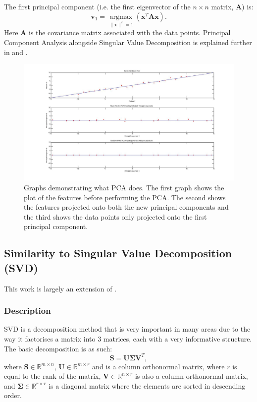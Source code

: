 \documentclass[11pt,a4paper]{article}
\newcommand{\covmat}{\mathbf{A}}
\begin{document}
The first principal component (i.e. the first eigenvector of the $n\times n$ matrix, $\mathbf{A}$) is:
\begin{equation}
\mathbf{v}_1 = \underset{\|\mathbf{x}\|^2 = 1}{\operatorname{argmax}}\left( \mathbf{x}^T\mathbf{A}\mathbf{x}\right).
\end{equation}
Here $\covmat$ is the covariance matrix associated with the data points. Principal Component Analysis alongside Singular Value Decomposition is explained further in \cite{datascience} and \cite{bishop}. 

\begin{figure}[H]
\centering
\includegraphics[scale=0.35]{PCA_EXPLAINED.jpg}
\caption{Graphs demonstrating what PCA does. The first graph shows the plot of the features before performing the PCA. The second shows the features projected onto both the new principal components and the third shows the data points only projected onto the first principal component.}
\label{pca}
\end{figure}

\subsection{Similarity to Singular Value Decomposition (SVD)}
This work is largely an extension of \cite{lecture_svd}.

\subsubsection{Description}
SVD is a decomposition method that is very important in many areas due to the way it factorises a matrix into 3 matrices, each with a very informative structure. The basic decomposition is as such:
\begin{equation}
\mathbf{S} = \mathbf{U}\mathbf{\Sigma}\mathbf{V}^T,
\end{equation}
where $\mathbf{S} \in \mathbb{R}^{m \times n}$,  $\mathbf{U} \in \mathbb{R}^{m \times r}$ and is a column orthonormal matrix, where $r$ is equal to the rank of the matrix,  $\mathbf{V} \in \mathbb{R}^{n \times r}$ is also a column orthonormal matrix, and  $\mathbf{\Sigma} \in \mathbb{R}^{r \times r}$ is a diagonal matrix where the elements are sorted in descending order.
\end{document}
